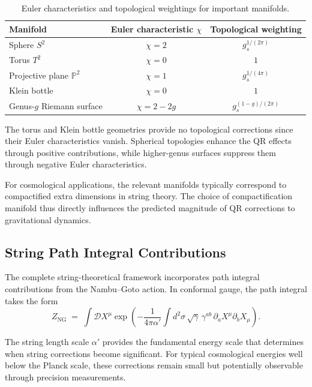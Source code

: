 \begin{table}[H]
\caption{Euler characteristics and topological weightings for important manifolds.}
\label{tab:euler-characteristics}
\centering
\begin{tabular}{@{}lcc@{}}
\toprule
\textbf{Manifold} & \textbf{Euler characteristic $\chi$} & \textbf{Topological weighting} \\
\midrule
Sphere $S^2$                     & $\chi = 2$        & $g_s^{1/(2\pi)}$ \\
Torus $T^2$                      & $\chi = 0$        & $1$ \\
Projective plane $\mathbb{P}^2$  & $\chi = 1$        & $g_s^{1/(4\pi)}$ \\
Klein bottle                      & $\chi = 0$        & $1$ \\
Genus-$g$ Riemann surface        & $\chi = 2-2g$     & $g_s^{(1-g)/(2\pi)}$ \\
\bottomrule
\end{tabular}
\end{table}

The torus and Klein bottle geometries provide no topological corrections since their Euler characteristics vanish. Spherical topologies enhance the QR effects through positive contributions, while higher-genus surfaces suppress them through negative Euler characteristics.

For cosmological applications, the relevant manifolds typically correspond to compactified extra dimensions in string theory. The choice of compactification manifold thus directly influences the predicted magnitude of QR corrections to gravitational dynamics.

\subsection{String Path Integral Contributions}
\label{subsec:path-integral}

The complete string-theoretical framework incorporates path integral contributions from the Nambu--Goto action. In conformal gauge, the path integral takes the form
\begin{equation}
Z_{\text{NG}} \;=\; \int \mathcal{D}X^\mu \exp\!\left(-\frac{1}{4\pi\alpha'} \int d^2\sigma\, \sqrt{\gamma}\,\gamma^{ab}\, \partial_a X^\mu \partial_b X_\mu\right).
\label{eq:nambu-goto-path-integral}
\end{equation}

The string length scale $\alpha'$ provides the fundamental energy scale that determines when string corrections become significant. For typical cosmological energies well below the Planck scale, these corrections remain small but potentially observable through precision measurements.

